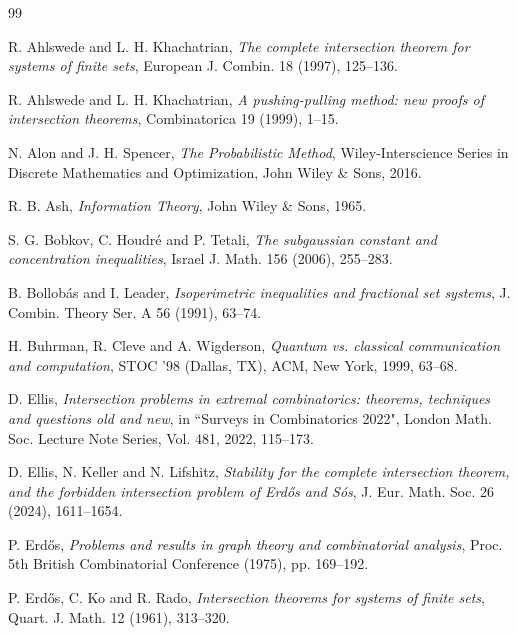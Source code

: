 \documentclass[10pt,a4paper]{amsart}
\theoremstyle{remark}
\begin{document}

\begin{thebibliography}{99}

 R. Ahlswede and L. H. Khachatrian,
\textit{The complete intersection theorem for systems of finite sets},
European J. Combin. 18 (1997), 125--136.

 R. Ahlswede and L. H. Khachatrian,
\textit{A pushing-pulling method: new proofs of intersection theorems},
Combinatorica 19 (1999), 1--15.

 N. Alon and J. H. Spencer,
\textit{The Probabilistic Method},
Wiley-Interscience Series in Discrete Mathematics and Optimization, John Wiley \& Sons, 2016.

 R. B. Ash,
\textit{Information Theory},
John Wiley \& Sons, 1965.

 S. G. Bobkov, C. Houdr{\'{e}} and P. Tetali,
\emph{The subgaussian constant and concentration inequalities},
Israel J. Math. 156 (2006), 255--283.

 B. Bollob{\'{a}}s and I. Leader,
\emph{Isoperimetric inequalities and fractional set systems},
J. Combin. Theory Ser. A 56 (1991), 63--74.

 H. Buhrman, R. Cleve and A. Wigderson,
\emph{Quantum vs. classical communication and computation},
STOC ’98 (Dallas, TX), ACM, New York, 1999, 63--68.

 D. Ellis,
\emph{Intersection problems in extremal combinatorics: theorems, techniques and questions old and new},
in ``Surveys in Combinatorics 2022", London Math. Soc. Lecture Note Series, Vol. 481,
2022, 115--173.

 D. Ellis, N. Keller and N. Lifshitz,
\emph{Stability for the complete intersection theorem, and the forbidden intersection problem
of Erd\H{o}s and S\'{o}s}, J. Eur. Math. Soc. 26 (2024), 1611--1654.

 P. Erd\H{o}s,
\emph{Problems and results in graph theory and combinatorial analysis},
Proc. 5th British Combinatorial Conference (1975), pp. 169--192.

 P. Erd\H{o}s, C. Ko and R. Rado,
\emph{Intersection theorems for systems of finite sets},
Quart. J. Math. 12 (1961), 313--320.


\end{thebibliography}
\end{document}
